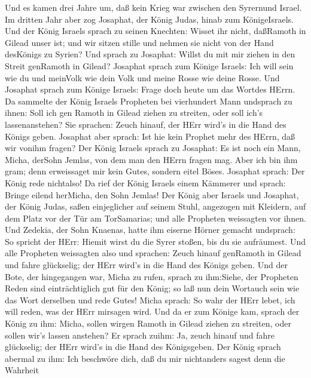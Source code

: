 Und es kamen drei Jahre um, daß kein Krieg war zwischen den
Syrernund Israel.  Im dritten Jahr aber zog Josaphat, der
König Judas, hinab zum KönigeIsraels.  Und der König Israels
sprach zu seinen Knechten: Wisset ihr nicht, daßRamoth in Gilead unser
ist; und wir sitzen stille und nehmen sie nicht von der Hand desKönigs
zu Syrien?  Und sprach zu Josaphat: Willst du mit mir ziehen
in den Streit genRamoth in Gilead? Josaphat sprach zum Könige Israels:
Ich will sein wie du und meinVolk wie dein Volk und meine Rosse wie
deine Rosse.  Und Josaphat sprach zum Könige Israels: Frage
doch heute um das Wortdes HErrn.  Da sammelte der König
Israels Propheten bei vierhundert Mann undsprach zu ihnen: Soll ich gen
Ramoth in Gilead ziehen zu streiten, oder soll ich's lassenanstehen? Sie
sprachen: Zeuch hinauf, der HErr wird's in die Hand des Königs geben.
 Josaphat aber sprach: Ist hie kein Prophet mehr des HErrn,
daß wir vonihm fragen?  Der König Israels sprach zu
Josaphat: Es ist noch ein Mann, Micha, derSohn Jemlas, von dem man den
HErrn fragen mag. Aber ich bin ihm gram; denn erweissaget mir kein
Gutes, sondern eitel Böses. Josaphat sprach: Der König rede nichtalso!
 Da rief der König Israels einem Kämmerer und sprach: Bringe
eilend herMicha, den Sohn Jemlas!  Der König aber Israels
und Josaphat, der König Judas, saßen einjeglicher auf seinem Stuhl,
angezogen mit Kleidern, auf dem Platz vor der Tür am TorSamarias; und
alle Propheten weissagten vor ihnen.  Und Zedekia, der Sohn
Knaenas, hatte ihm eiserne Hörner gemacht undsprach: So spricht der
HErr: Hiemit wirst du die Syrer stoßen, bis du sie aufräumest.
 Und alle Propheten weissagten also und sprachen: Zeuch
hinauf genRamoth in Gilead und fahre glückselig; der HErr wird's in die
Hand des Königs geben.  Und der Bote, der hingegangen war,
Micha zu rufen, sprach zu ihm:Siehe, der Propheten Reden sind
einträchtiglich gut für den König; so laß nun dein Wortauch sein wie das
Wort derselben und rede Gutes!  Micha sprach: So wahr der
HErr lebet, ich will reden, was der HErr mirsagen wird. 
Und da er zum Könige kam, sprach der König zu ihm: Micha, sollen wirgen
Ramoth in Gilead ziehen zu streiten, oder sollen wir's lassen anstehen?
Er sprach zuihm: Ja, zeuch hinauf und fahre glückselig; der HErr wird's
in die Hand des Königsgeben.  Der König sprach abermal zu
ihm: Ich beschwöre dich, daß du mir nichtanders sagest denn die Wahrheit
